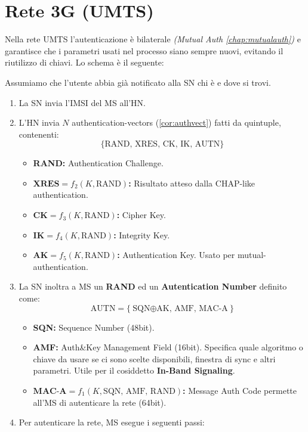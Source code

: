 \section{Rete 3G (UMTS)}
Nella rete UMTS l'autenticazione è bilaterale \textit{(Mutual Auth \cref{chap:mutualauth})} e garantisce che i parametri usati nel processo siano sempre nuovi, evitando il riutilizzo di chiavi. Lo schema è il seguente:
\begin{proposition}\label{prop:3gauth}
Assumiamo che l'utente abbia già notificato alla SN chi è e dove si trovi.
\begin{enumerate}
    \item La SN invia l'IMSI del MS all'HN.
    \item\label{authvect5} L'HN invia $N$ authentication-vectors (\cref{cor:authvect}) fatti da quintuple, contenenti:
    \[\{\text{RAND, XRES, CK, IK, AUTN}\}\]
    \begin{itemize}
        \item \textbf{RAND:} Authentication Challenge.
        \item $\textbf{XRES}=f_2(K,\text{RAND})$\textbf{:} Risultato atteso dalla CHAP-like authentication.
        \item $\textbf{CK}=f_3(K,\text{RAND})$\textbf{:} Cipher Key.
        \item $\textbf{IK}=f_4(K,\text{RAND})$\textbf{:} Integrity Key.
        \item $\textbf{AK}=f_5(K,\text{RAND})$\textbf{:} Authentication Key. Usato per mutual-authentication.
    \end{itemize}
    \item La SN inoltra a MS un \textbf{RAND} ed un \textbf{Autentication Number} definito come:
    \[\text{AUTN}=\{\text{SQN$\oplus$AK, AMF, MAC-A}\}\]
    \begin{itemize}
        \item \textbf{SQN:} Sequence Number (48bit).
        \item \textbf{AMF:} Auth\&Key Management Field (16bit). Specifica quale algoritmo o chiave da usare se ci sono scelte disponibili, finestra di sync e altri parametri. Utile per il cosiddetto \textbf{In-Band Signaling}.
        \item $\textbf{MAC-A}=f_1(K,\text{SQN, AMF, RAND})$\textbf{:} Message Auth Code permette all'MS di autenticare la rete (64bit).
    \end{itemize}
    \item Per autenticare la rete, MS esegue i seguenti passi:

\end{enumerate}
\end{proposition}
